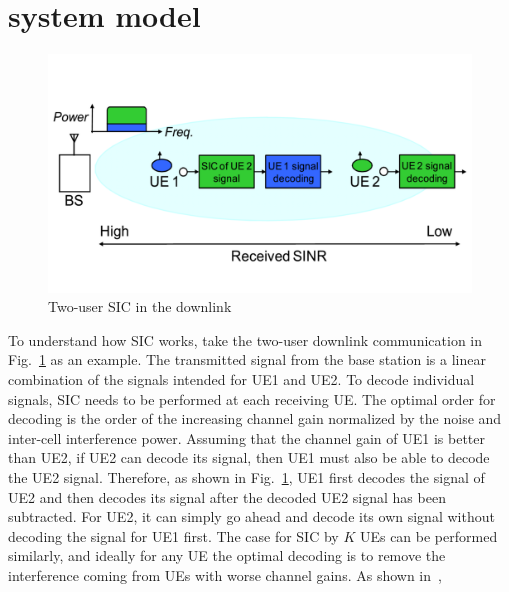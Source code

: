 \section{system model}
\begin{figure}[t]
\begin{center}
\includegraphics[width=1.0\columnwidth ,angle=0]{figure/NOMA_shannon}
\caption{Two-user SIC in the downlink}
\label{fig_NOMA_shannon}
\end{center}
\end{figure}
To understand how SIC works, take the two-user downlink communication in Fig.~\ref{fig_NOMA_shannon} as an example. The transmitted signal from the base station is a linear combination of the signals intended for UE1 and UE2. To decode individual signals, SIC needs to be performed at
each receiving UE. 
The optimal order for decoding is the order of the increasing channel gain normalized by the noise and inter-cell interference power. 
Assuming that the channel gain of UE1 is better than UE2, if UE2 can decode its signal, then UE1 must also be able to decode the UE2 signal.
Therefore, as shown in Fig.~\ref{fig_NOMA_shannon}, UE1 first decodes the signal of UE2 and then decodes its signal after the decoded
UE2 signal has been subtracted. 
For UE2, it can simply go ahead and decode its own signal without decoding the signal for UE1 first.
The case for SIC by $K$ UEs can be performed similarly, and ideally for any UE
the optimal decoding is to remove the interference coming from UEs with worse channel gains.
As shown in~\cite{cite_docomo1}, 
